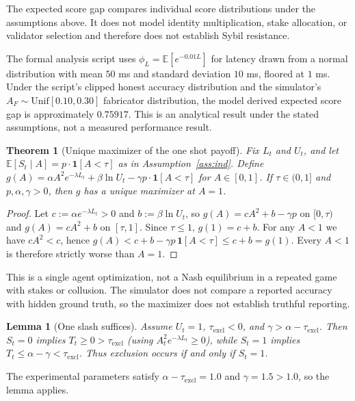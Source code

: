 \documentclass[conference]{IEEEtran}
\newtheorem{theorem}{Theorem}
\newtheorem{lemma}{Lemma}
\begin{document}
The expected score gap compares individual score distributions under the assumptions above. It does not model identity multiplication, stake allocation, or validator selection and therefore does not establish Sybil resistance.

The formal analysis script uses $\phi_L=\mathbb{E}[e^{-0.01 L}]$ for latency drawn from a normal distribution with mean $50$ ms and standard deviation $10$ ms, floored at $1$ ms. Under the script's clipped honest accuracy distribution and the simulator's $A_F\sim\mathrm{Unif}[0.10,0.30]$ fabricator distribution, the model derived expected score gap is approximately $0.75917$. This is an analytical result under the stated assumptions, not a measured performance result.

\begin{theorem}[Unique maximizer of the one shot payoff]
\label{thm:game}
Fix $L_t$ and $U_t$, and let $\mathbb{E}[S_t\mid A]=p\cdot\mathbf{1}[A<\tau]$ as in Assumption~\ref{ass:ind}. Define $g(A)=\alpha A^2 e^{-\lambda L_t}+\beta\ln U_t-\gamma p\cdot\mathbf{1}[A<\tau]$ for $A\in[0,1]$. If $\tau\in(0,1]$ and $p,\alpha,\gamma>0$, then $g$ has a unique maximizer at $A=1$.
\end{theorem}

\begin{proof}
Let $c:=\alpha e^{-\lambda L_t}>0$ and $b:=\beta\ln U_t$, so $g(A)=cA^2+b-\gamma p$ on $[0,\tau)$ and $g(A)=cA^2+b$ on $[\tau,1]$. Since $\tau\le 1$, $g(1)=c+b$. For any $A<1$ we have $cA^2<c$, hence $g(A)<c+b-\gamma p\,\mathbf{1}[A<\tau]\le c+b=g(1)$. Every $A<1$ is therefore strictly worse than $A=1$.
\end{proof}

This is a single agent optimization, not a Nash equilibrium in a repeated game with stakes or collusion. The simulator does not compare a reported accuracy with hidden ground truth, so the maximizer does not establish truthful reporting.

\begin{lemma}[One slash suffices]
\label{lem:slash}
Assume $U_t=1$, $\tau_{\mathrm{excl}}<0$, and $\gamma>\alpha-\tau_{\mathrm{excl}}$. Then $S_t=0$ implies $T_t\ge 0>\tau_{\mathrm{excl}}$ (using $A_t^2 e^{-\lambda L_t}\ge 0$), while $S_t=1$ implies $T_t\le\alpha-\gamma<\tau_{\mathrm{excl}}$. Thus exclusion occurs if and only if $S_t=1$.
\end{lemma}

The experimental parameters satisfy $\alpha-\tau_{\mathrm{excl}}=1.0$ and $\gamma=1.5>1.0$, so the lemma applies.
\end{document}
